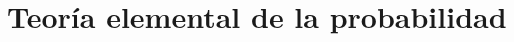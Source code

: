 \documentclass[a4paper,11pt]{book}
\theoremstyle{definition}
\begin{document}
%
%


\section{Teor\'ia elemental de la probabilidad} \label{sec:teoria_elemental_probabilidad}
\end{document}
